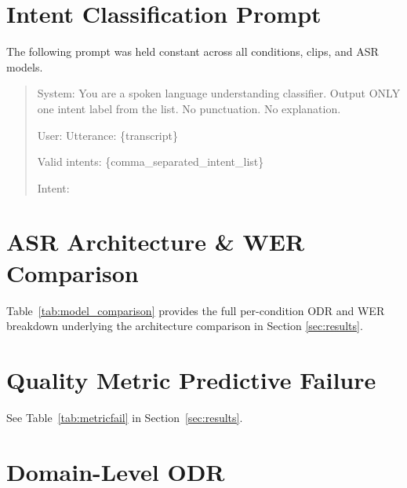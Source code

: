\documentclass[11pt]{article}
\begin{document}
\appendix
\section{Intent Classification Prompt}
\label{app:prompt}
 
The following prompt was held constant across all conditions, clips,
and ASR models.
 
\begin{quote}
\small\ttfamily
System: You are a spoken language understanding classifier.
Output ONLY one intent label from the list.
No punctuation. No explanation.
 
\medskip
User: Utterance: \{transcript\}
 
Valid intents: \{comma\_separated\_intent\_list\}
 
Intent:
\end{quote}
 
\section{ASR Architecture \& WER Comparison}
\label{app:arch}\label{app:wer}

Table~\ref{tab:model_comparison} provides the full per-condition
ODR and WER breakdown underlying the architecture comparison
in Section \ref{sec:results}.


\section{Quality Metric Predictive Failure}
\label{app:metricfail}

See Table~\ref{tab:metricfail} in Section~\ref{sec:results}.

\vspace{-4pt}
\section{Domain-Level ODR}
\label{app:domain}

\end{document}
